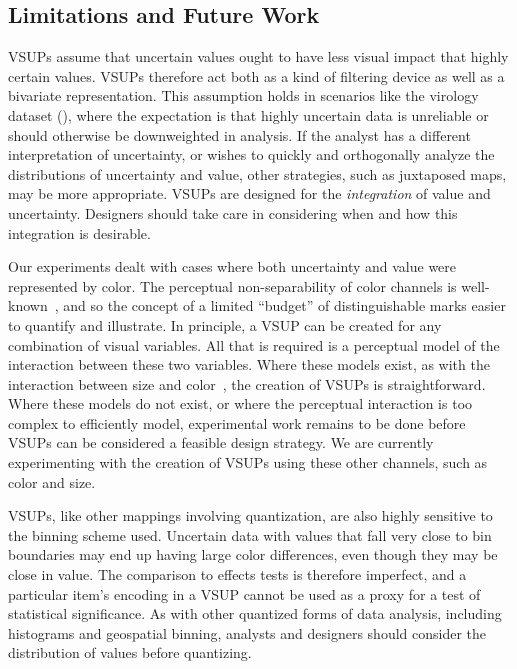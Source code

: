 \subsection{Limitations and Future Work}

VSUPs assume that uncertain values ought to have less visual impact that highly certain values. VSUPs therefore act both as a kind of filtering device as well as a bivariate representation. This assumption holds in scenarios like the virology dataset (\figref{fig:pollingVsum]}), where the expectation is that highly uncertain data is unreliable or should otherwise be downweighted in analysis. If the analyst has a different interpretation of uncertainty, or wishes to quickly and orthogonally analyze the distributions of uncertainty and value, other strategies, such as juxtaposed maps, may be more appropriate. VSUPs are designed for the \emph{integration} of value and uncertainty. Designers should take care in considering when and how this integration is desirable.

Our experiments dealt with cases where both uncertainty and value were represented by color. The perceptual non-separability of color channels is well-known~\cite{garner1970integrality, ware2012information}, and so the concept of a limited ``budget'' of distinguishable marks easier to quantify and illustrate. In principle, a VSUP can be created for any combination of visual variables. All that is required is a perceptual model of the interaction between these two variables. Where these models exist, as with the interaction between size and color~\cite{stone2014engineering}, the creation of VSUPs is straightforward. Where these models do not exist, or where the perceptual interaction is too complex to efficiently model, experimental work remains to be done before VSUPs can be considered a feasible design strategy. We are currently experimenting with the creation of VSUPs using these other channels, such as color and size.

VSUPs, like other mappings involving quantization, are also highly sensitive to the binning scheme used. Uncertain data with values that fall very close to bin boundaries may end up having large color differences, even though they may be close in value. The comparison to effects tests is therefore imperfect, and a particular item's encoding in a VSUP cannot be used as a proxy for a test of statistical significance. As with other quantized forms of data analysis, including histograms and geospatial binning, analysts and designers should consider the distribution of values before quantizing.

